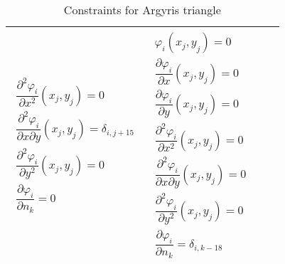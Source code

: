 \begin{sidewaystable}
\begin{center}
{\begin{tabular}{|p{2in}|p{2in}|p{2in}|p{2in}|}
\begin{equation*}
\begin{split}
		\dfrac{\partial^2 \varphi_i}{\partial x^2} (x_j,y_j) = 0 \\
		\dfrac{\partial^2 \varphi_i}{\partial x \partial y} (x_j,y_j) = \delta_{i,j+15} \\
		\dfrac{\partial^2 \varphi_i}{\partial y^2} (x_j,y_j) = 0 \\
		\dfrac{\partial\varphi_i}{\partial n_k} = 0
		\end{split}
	\end{equation*}
	& \begin{equation*}
		\begin{split}
		\varphi_i (x_j,y_j) = 0 \\
		\dfrac{\partial \varphi_i}{\partial x} (x_j,y_j) = 0 \\
		\dfrac{\partial \varphi_i}{\partial y} (x_j,y_j) = 0 \\
		\dfrac{\partial^2 \varphi_i}{\partial x^2} (x_j,y_j) = 0 \\
		\dfrac{\partial^2 \varphi_i}{\partial x \partial y} (x_j,y_j) = 0 \\
		\dfrac{\partial^2 \varphi_i}{\partial y^2} (x_j,y_j) = 0 \\
		\dfrac{\partial\varphi_i}{\partial n_k} = \delta_{i,k-18}
		\end{split}
	\end{equation*} & \\
	\hline
\end{tabular}}
\caption{Constraints for Argyris triangle
  \cite{Argyris,Brenner,Ciarlet,Dominguez08}}
\label{tab:Constraints}
\end{center}
\end{sidewaystable}
